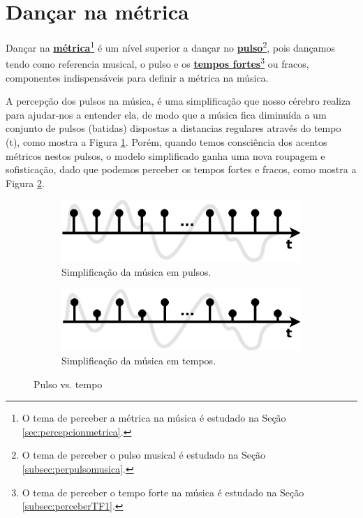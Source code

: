 
\newpage
\section{Dançar na métrica}
\label{subsec:dancametrica}
Dançar na \hyperref[sec:percepcionmetrica]{\textbf{métrica}}\footnote{O 
tema de perceber a métrica na música é estudado na Seção 
\ref{sec:percepcionmetrica}.} 
é um nível superior a dançar no \hyperref[subsec:perpulsomusica]{\textbf{pulso}}\footnote{O 
tema de perceber o pulso musical é estudado na Seção \ref{subsec:perpulsomusica}.},
pois dançamos tendo como referencia musical, o pulso
e os \hyperref[subsec:perceberTF1]{\textbf{tempos fortes}}\footnote{O 
tema de perceber o tempo forte na música é estudado na Seção 
\ref{subsec:perceberTF1}.}  ou fracos,
componentes indispensáveis para definir a métrica na música.

A percepção dos pulsos na música, 
é uma simplificação que nosso cérebro realiza para ajudar-nos a entender ela,
de modo que a música fica diminuída a um conjunto de pulsos (batidas) dispostas
a distancias regulares através do tempo (t), como mostra a Figura \ref{fig:metrica:pulso}.
Porém, quando temos consciência dos acentos métricos nestos pulsos,
o modelo simplificado ganha uma nova roupagem e sofisticação, 
dado que podemos perceber os tempos fortes e fracos, como mostra a Figura \ref{fig:metrica:tempo}.
\begin{figure}[!h]
     \centering
     \begin{subfigure}[b]{0.485\textwidth}
         \centering
         \includegraphics[width=\textwidth]{chapters/cap-musicalidade-tecnica/aspectos-metrica-a.eps}
         \caption{Simplificação da música em pulsos.}
         \label{fig:metrica:pulso}
     \end{subfigure}
     \hfill
     \begin{subfigure}[b]{0.485\textwidth}
         \centering
         \includegraphics[width=\textwidth]{chapters/cap-musicalidade-tecnica/aspectos-metrica-b.eps}
         \caption{Simplificação da música em tempos.}
         \label{fig:metrica:tempo}
     \end{subfigure}
        \caption{Pulso vs. tempo}
        \label{fig:metricapulsotempo}
\end{figure}


